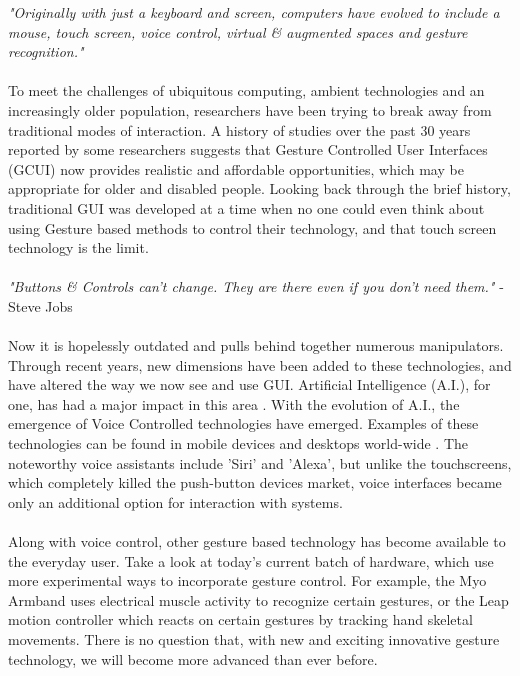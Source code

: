 \documentclass{article}
\begin{document}
\textit{"Originally with just a keyboard and screen, computers have evolved to include a mouse, touch screen, voice control, virtual \& augmented spaces and gesture recognition."}
\\\\
To meet the challenges of ubiquitous computing, ambient technologies and an increasingly older population, researchers have been trying to break away from traditional modes of interaction. A history of studies over the past 30 years reported by some researchers \cite{bhuiyan2011gesture} suggests that Gesture Controlled User Interfaces (GCUI) now provides realistic and affordable opportunities, which may be appropriate for older and disabled people. Looking back through the brief history, traditional GUI was developed at a time when no one could even think about using Gesture based methods to control their technology, and that touch screen technology is the limit.
\\\\
\textit{"Buttons \& Controls can’t change. They are there even if you don’t need them."} - Steve Jobs \cite{wilson2007iphone}
\\\\
Now it is hopelessly outdated and pulls behind together numerous manipulators. Through recent years, new dimensions have been added to these technologies, and have altered the way we now see and use GUI. Artificial Intelligence (A.I.), for one, has had a major impact in this area \cite{massaro2015siri}. With the evolution of A.I., the emergence of Voice Controlled technologies have emerged. Examples of these technologies can be found in mobile devices and desktops world-wide \cite{tang2017emergence}. The noteworthy voice assistants include 'Siri' and 'Alexa', but unlike the touchscreens, which completely killed the push-button devices market, voice interfaces became only an additional option for interaction with systems.
\\\\
Along with voice control, other gesture based technology has become available to the everyday user. Take a look at today's current batch of hardware, which use more experimental ways to incorporate gesture control. For example, the Myo Armband \cite{abreu2016evaluating} uses electrical muscle activity to recognize certain gestures, or the Leap motion controller \cite{weichert2013analysis} which reacts on certain gestures by tracking hand skeletal movements. There is no question that, with new and exciting innovative gesture technology, we will become more advanced than ever before.
\end{document}
